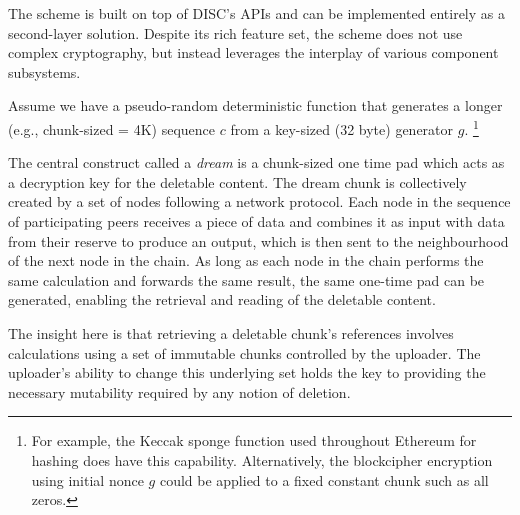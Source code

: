 The scheme is built on top of DISC's APIs and can be implemented entirely as a second-layer solution.  Despite its rich feature set, the scheme does not use complex cryptography, but instead leverages the interplay of various component subsystems.




Assume we have a pseudo-random deterministic function that generates a longer (e.g., chunk-sized = 4K) sequence $c$ from a key-sized (32 byte) generator $g$.%
%
\footnote{For example, the Keccak sponge function used throughout Ethereum for hashing does have this capability. Alternatively, the blockcipher encryption using initial nonce $g$ could be applied to a  fixed constant chunk such as all zeros.}


The central construct called a \emph{dream} is a chunk-sized one time pad which acts as a decryption key for the deletable content. The dream chunk is collectively created by a set of nodes following a network protocol. Each node in the sequence of participating peers receives a piece of data and combines it as input with data from their reserve to produce an output, which is then sent to the neighbourhood of the next node in the chain. As long as each node in the chain performs the same calculation and forwards the same result, the same one-time pad can be generated, enabling the retrieval and reading of the deletable content.

The insight here is that retrieving a deletable chunk's references involves calculations using a set of immutable chunks controlled by the uploader. The uploader's ability to change this underlying set holds the key to providing the necessary mutability required by any notion of deletion. 
 

